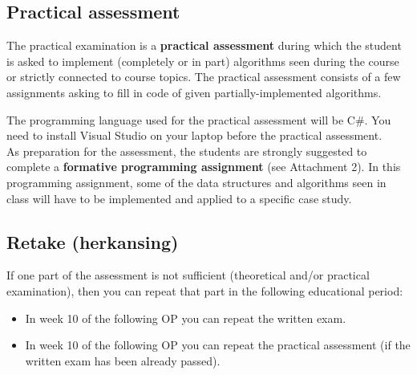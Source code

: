 	\subsection{Practical assessment}
	The practical examination is a \textbf{practical assessment} during which the student is asked to implement (completely or in part) algorithms seen during the course or strictly connected to course topics. The practical assessment consists of a few assignments asking to fill in code of given partially-implemented algorithms.
	
	The programming language used for the practical assessment will be C\#. You need to install Visual Studio on your laptop before the practical assessment.\\
	
	As preparation for the assessment, the students are strongly suggested to complete a \textbf{formative programming assignment} (see Attachment 2). In this programming assignment, some of the data structures and algorithms seen in class will have to be implemented and applied to a specific case study.\\ 

	
	\subsection{Retake (herkansing)}
	If one part of the assessment is not sufficient (theoretical and/or practical examination), then you can repeat that part in the following educational period:
	\begin{itemize}
	\item In week 10 of the following OP you can repeat the written exam.
	\item In week 10 of the following OP you can repeat the practical assessment (if the written exam has been already passed).
	\end{itemize}
	
